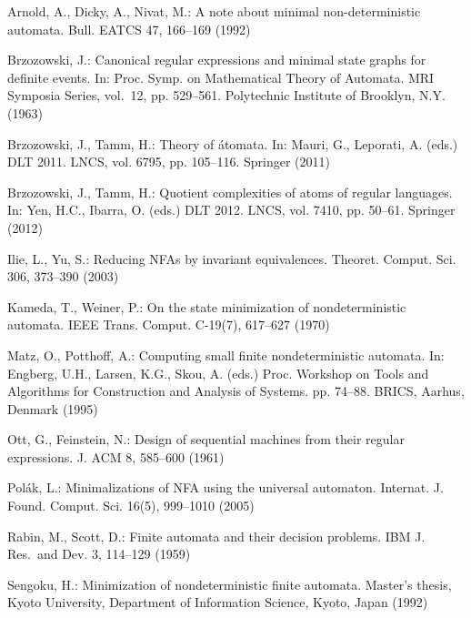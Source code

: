 \documentclass{llncs}
\begin{document}
\begin{thebibliography}{10}
\providecommand{\url}[1]{\texttt{#1}}
\providecommand{\urlprefix}{URL }

Arnold, A., Dicky, A., Nivat, M.: A note about minimal non-deterministic
  automata. Bull. EATCS  47,  166--169 (1992)

Brzozowski, J.: Canonical regular expressions and minimal state graphs for
  definite events. In: Proc. Symp. on Mathematical Theory of Automata. MRI
  Symposia Series, vol.~12, pp. 529--561. Polytechnic Institute of Brooklyn,
  N.Y. (1963)

Brzozowski, J., Tamm, H.: Theory of \'atomata. In: Mauri, G., Leporati, A.
  (eds.) DLT 2011. LNCS, vol. 6795, pp. 105--116. Springer (2011)

Brzozowski, J., Tamm, H.: Quotient complexities of atoms of regular languages.
  In: Yen, H.C., Ibarra, O. (eds.) DLT 2012. LNCS, vol. 7410, pp. 50--61.
  Springer (2012)

Ilie, L., Yu, S.: Reducing {NFA}s by invariant equivalences. Theoret. Comput.
  Sci.  306,  373--390 (2003)

Kameda, T., Weiner, P.: On the state minimization of nondeterministic automata.
  IEEE Trans. Comput.  C-19(7),  617--627 (1970)

Matz, O., Potthoff, A.: Computing small finite nondeterministic automata. In:
  Engberg, U.H., Larsen, K.G., Skou, A. (eds.) Proc. Workshop on Tools and
  Algorithms for Construction and Analysis of Systems. pp. 74--88. BRICS,
  Aarhus, Denmark (1995)

Ott, G., Feinstein, N.: Design of sequential machines from their regular
  expressions. J. ACM  8,  585--600 (1961)

Pol\'ak, L.: Minimalizations of {NFA} using the universal automaton. Internat.
  J. Found. Comput. Sci.  16(5),  999--1010 (2005)

Rabin, M., Scott, D.: Finite automata and their decision problems. IBM J. Res.\
  and Dev.  3,  114--129 (1959)

Sengoku, H.: Minimization of nondeterministic finite automata. Master's thesis,
  Kyoto University, Department of Information Science, Kyoto, Japan (1992)

\end{thebibliography}
\end{document}

